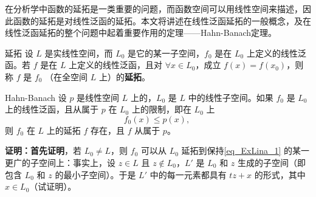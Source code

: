 
在分析学中函数的延拓是一类重要的问题，而函数空间可以用线性空间来描述，因此函数的延拓是对线性泛函的延拓。本文将讲述在线性泛函延拓的一般概念，及在线性泛函延拓的整个问题中起着重要作用的定理——Hahn-Banach定理。

\begin{definition}{延拓}
设 $L$ 是实线性空间，而 $L_0$ 是它的某一子空间，$f_0$ 是在 $L_0$ 上定义的线性泛函。若 $f$ 是在 $L$ 上定义的线性泛函，且对 $\forall x\in L_0$，成立 $f(x)=f(x_0)$，则称 $f$ 是 $f_0$ （在全空间 $L$ 上）的\textbf{延拓}。
\end{definition}


\begin{theorem}{Hahn-Banach}
设 $p$ 是线性空间 $L$ 上的，$L_0$ 是 $L$ 中的线性子空间。如果 $f_0$ 是 $L_0$ 上的线性泛函，且从属于 $p$ 在 $L_0$ 上的限制，即在 $L_0$ 上
\begin{equation}\label{eq_ExLina_1}
f_0(x)\leq p(x),~
\end{equation}
则 $f_0$ 在 $L$ 上的延拓 $f$ 存在，且 $f$ 从属于 $p$。
\end{theorem}

\textbf{证明：}\textbf{首先证明}，若 $L_0\neq L$，则 $f_0$ 可以从 $L_0$ 延拓到保持\autoref{eq_ExLina_1} 的某一更广的子空间上：事实上，设 $z\in L$ 且 $z\notin L_0$，$L'$ 是 $L_0$ 和 $z$ 生成的子空间（即包含 $L_0$ 和 $z$ 的最小子空间）。于是 $L'$ 中的每一元素都具有 $tz+x$ 的形式，其中 $x\in L_0$（试证明）。

